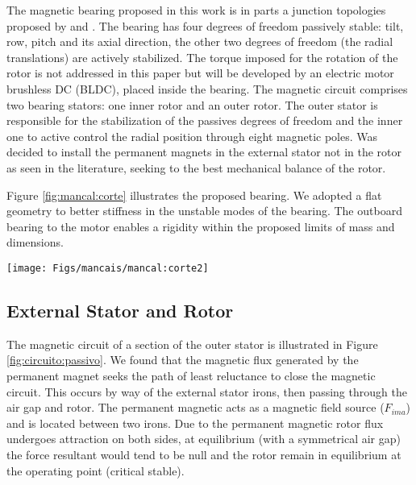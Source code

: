 \documentclass[journal,a4paper,oneside,twocolumn]{IEEEtran}
\begin{document}
The magnetic bearing proposed in this work is in parts a junction topologies proposed by \cite{Bernus1998} and \cite{Scharfe2001}. The bearing has four degrees of freedom passively stable: tilt, row, pitch and its axial direction, the other two degrees of freedom (the radial translations) are actively stabilized. The torque imposed for the rotation of the rotor is not addressed in this paper but will be developed by an electric motor brushless DC (BLDC), placed inside the bearing. The magnetic circuit comprises two bearing stators: one inner rotor and an outer rotor. The outer stator is responsible for the stabilization of the passives degrees of freedom and the inner one to active control the radial position through eight magnetic poles. Was decided to install the permanent magnets in the external stator not in the rotor as seen in the literature, seeking to the best mechanical balance of the rotor.

Figure \ref{fig:mancal:corte} illustrates the proposed bearing. We adopted a flat geometry to better stiffness in the unstable modes of the bearing. The outboard bearing to the motor enables a rigidity within the proposed limits of mass and dimensions.

\begin{figure*}
\centering
\texttt{[image: Figs/mancais/mancal:corte2]}
\caption{Radial cut of the proposed magnetic bearing. (a) External stator; (b) rotor; (c) internal stator; (d) permanent magnetics; (e) coils}
\label{fig:mancal:corte}
\end{figure*}

\subsection{External Stator and Rotor}

The magnetic circuit of a section of the outer stator is illustrated in Figure \ref{fig:circuito:passivo}. We found that the magnetic flux generated by the permanent magnet seeks the path of least reluctance to close the magnetic circuit. This occurs by way of the external stator irons, then passing through the air gap and rotor. The permanent magnetic acts as a magnetic field source ($ F_ {ima} $) and is located between two irons. Due to the permanent magnetic rotor flux undergoes attraction on both sides, at equilibrium (with a symmetrical air gap) the force resultant would tend to be null and the rotor remain in equilibrium at the operating point (critical stable). 
\end{document}
